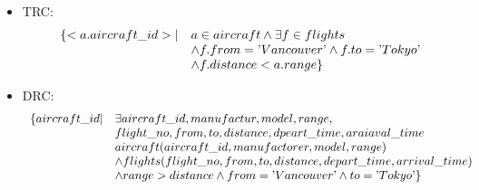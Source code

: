 \begin{exercise}{8}
\begin{subexercise}
  \begin{itemize}
  \item TRC:
    \begin{displaymath}
      \begin{array}{l l}
        \{ < a.aircraft\_id > | & a \in aircraft \land \exists f \in flights \\
                                & \land f.from=\text{'}Vancouver\text{'} \land
                                  f.to=\text{'}Tokyo\text{'} \\
                                & \land f.distance < a.range \}
      \end{array}
    \end{displaymath}
  \item DRC:
    \begin{displaymath}
      \begin{array}{l l}
        \{ aircraft\_id | &\exists aircraft\_id, manufactur, model, range, \\
                          & flight\_no, from, to, distance, dpeart\_time, araiaval\_time \\
                          & aircraft(aircraft\_id, manufactorer, model, range) \\
                          & \land flights(flight\_no, from, to, distance,
                          depart\_time, arrival\_time ) \\
                          & \land range > distance \land
                          from=\text{'}Vancouver\text{'} \land
                          to=\text{'}Tokyo\text{'}\}
      \end{array}
    \end{displaymath}
  \end{itemize}
\end{subexercise}


\end{exercise}
